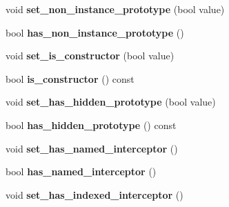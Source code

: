 \begin{DoxyCompactItemize}
\item 
void {\bfseries set\+\_\+non\+\_\+instance\+\_\+prototype} (bool value)\hypertarget{classv8_1_1internal_1_1_map_a0bf42a0d653fda55aedb301861ceb869}{}\label{classv8_1_1internal_1_1_map_a0bf42a0d653fda55aedb301861ceb869}

\item 
bool {\bfseries has\+\_\+non\+\_\+instance\+\_\+prototype} ()\hypertarget{classv8_1_1internal_1_1_map_aa5ba1ea3cd9833c8f52f9e477338f4ba}{}\label{classv8_1_1internal_1_1_map_aa5ba1ea3cd9833c8f52f9e477338f4ba}

\item 
void {\bfseries set\+\_\+is\+\_\+constructor} (bool value)\hypertarget{classv8_1_1internal_1_1_map_a36c1270a3e01c1cf711637184797bba0}{}\label{classv8_1_1internal_1_1_map_a36c1270a3e01c1cf711637184797bba0}

\item 
bool {\bfseries is\+\_\+constructor} () const \hypertarget{classv8_1_1internal_1_1_map_ae4ee0dc9b0446af7b857c500f7577410}{}\label{classv8_1_1internal_1_1_map_ae4ee0dc9b0446af7b857c500f7577410}

\item 
void {\bfseries set\+\_\+has\+\_\+hidden\+\_\+prototype} (bool value)\hypertarget{classv8_1_1internal_1_1_map_ab847b8495198c999ea07605cf3a24a8b}{}\label{classv8_1_1internal_1_1_map_ab847b8495198c999ea07605cf3a24a8b}

\item 
bool {\bfseries has\+\_\+hidden\+\_\+prototype} () const \hypertarget{classv8_1_1internal_1_1_map_aa5e93f60cf43aebbe152eeff77358109}{}\label{classv8_1_1internal_1_1_map_aa5e93f60cf43aebbe152eeff77358109}

\item 
void {\bfseries set\+\_\+has\+\_\+named\+\_\+interceptor} ()\hypertarget{classv8_1_1internal_1_1_map_a9645e689ef1fb654bb7e4ad8cc993b83}{}\label{classv8_1_1internal_1_1_map_a9645e689ef1fb654bb7e4ad8cc993b83}

\item 
bool {\bfseries has\+\_\+named\+\_\+interceptor} ()\hypertarget{classv8_1_1internal_1_1_map_a4475b2c44b9e4cdb315f3118264daa2f}{}\label{classv8_1_1internal_1_1_map_a4475b2c44b9e4cdb315f3118264daa2f}

\item 
void {\bfseries set\+\_\+has\+\_\+indexed\+\_\+interceptor} ()\hypertarget{classv8_1_1internal_1_1_map_aec70bb5bd2f3f0866d962970acb66f87}{}\label{classv8_1_1internal_1_1_map_aec70bb5bd2f3f0866d962970acb66f87}


\end{DoxyCompactItemize}

